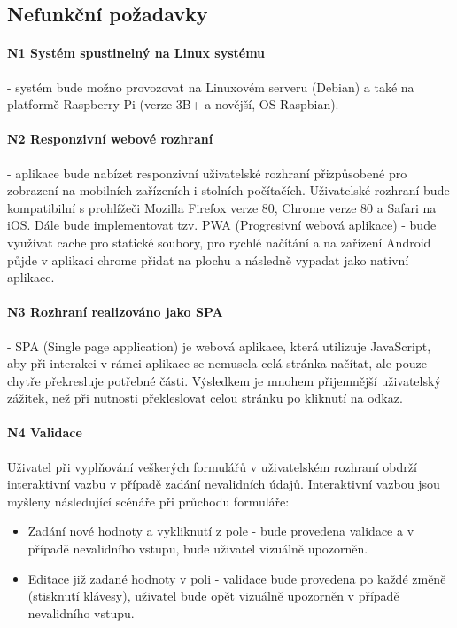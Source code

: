 \subsection{Nefunkční požadavky}

\paragraph{N1 Systém spustinelný na Linux systému}
- systém bude možno provozovat na Linuxovém serveru (Debian) a také na platformě Raspberry Pi (verze 3B+ a novější, OS Raspbian).

\paragraph{N2 Responzivní webové rozhraní}
- aplikace bude nabízet responzivní uživatelské rozhraní přizpůsobené pro zobrazení na mobilních zařízeních i stolních počítačích. Uživatelské rozhraní bude kompatibilní s prohlížeči Mozilla Firefox verze 80, Chrome verze 80 a Safari na iOS. Dále bude implementovat tzv. PWA (Progresivní webová aplikace) - bude využívat cache pro statické soubory, pro rychlé načítání a na zařízení Android půjde v aplikaci chrome přidat na plochu a následně vypadat jako nativní aplikace.

\paragraph{N3 Rozhraní realizováno jako SPA}
- SPA (Single page application) je webová aplikace, která utilizuje JavaScript, aby při interakci v rámci aplikace se nemusela celá stránka načítat, ale pouze chytře překresluje potřebné části. Výsledkem je mnohem přijemnější uživatelský zážitek, než při nutnosti překleslovat celou stránku po kliknutí na odkaz.

\paragraph{N4 Validace}
Uživatel při vyplňování veškerých formulářů v uživatelském rozhraní obdrží interaktivní vazbu v případě zadání nevalidních údajů. Interaktivní vazbou jsou myšleny následující scénáře při průchodu formuláře:
\begin{itemize}
    \item Zadání nové hodnoty a vykliknutí z pole - bude provedena validace a v případě nevalidního vstupu, bude uživatel vizuálně  upozorněn.
    \item Editace již zadané hodnoty v poli - validace bude provedena po každé změně (stisknutí klávesy), uživatel bude opět vizuálně upozorněn v případě nevalidního vstupu.
\end{itemize}

